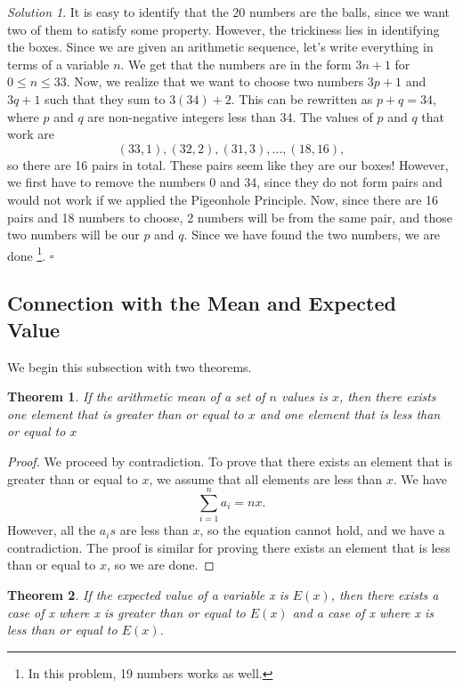 \documentclass[l1pt]{article}
\theoremstyle{plain}
\newtheorem{thm}{Theorem}[section]
\theoremstyle{definition}
\theoremstyle{remark}
\newtheorem*{solution}{Solution}
\begin{document}
\begin{solution}
It is easy to identify that the 20 numbers are the balls, since we want two of them to satisfy some property. However, the trickiness lies in identifying the boxes. Since we are given an arithmetic sequence, let's write everything in terms of a variable $n$. We get that the numbers are in the form $3n+1$ for $0\leq n \leq 33$. Now, we realize that we want to choose two numbers $3p+1$ and $3q+1$ such that they sum to $3(34)+2$. This can be rewritten as $p+q=34$, where $p$ and $q$ are non-negative integers less than 34. The values of $p$ and $q$ that work are \[(33, 1), (32, 2), (31, 3), \dots , (18, 16),\] so there are 16 pairs in total. These pairs seem like they are our boxes! However, we first have to remove the numbers 0 and 34, since they do not form pairs and would not work if we applied the Pigeonhole Principle. Now, since there are 16 pairs and 18 numbers to choose, 2 numbers will be from the same pair, and those two numbers will be our $p$ and $q$. Since we have found the two numbers, we are done \footnote{In this problem, 19 numbers works as well.}. $\square$
\end{solution}



\subsection{Connection with the Mean and Expected Value}
We begin this subsection with two theorems.

\begin{mdframed}
    \begin{thm}
    \label{thm:arithmetic mean}
    If the arithmetic mean of a set of $n$ values is $x$, then there exists one element that is greater than or equal to $x$ and one element that is less than or equal to $x$
    \end{thm}
\end{mdframed}

\begin{proof}
We proceed by contradiction. To prove that there exists an element that is greater than or equal to $x$, we assume that all elements are less than $x$. We have \[\sum_{i=1}^n a_i=nx .\] However, all the $a_is$ are less than $x$, so the equation cannot hold, and we have a contradiction. The proof is similar for proving there exists an element that is less than or equal to $x$, so we are done.
\end{proof}

\begin{mdframed}
    \begin{thm}
    \label{thm:expected value}
    If the expected value of a variable x is $E(x)$, then there exists a case of x where x is greater than or equal to $E(x)$ and a case of x where x is less than or equal to $E(x)$.
    \end{thm}
\end{mdframed}
\end{document}
